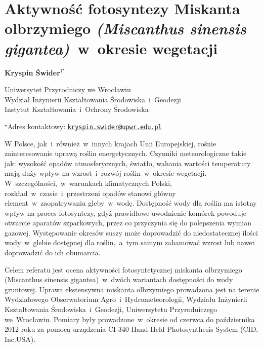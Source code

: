 \documentclass[\main/boa.tex]{subfiles}
\begin{document}
\section{Aktywność fotosyntezy Miskanta olbrzymiego \emph{(Miscanthus sinensis gigantea)}~w~okresie wegetacji}

\begin{center}
  {\bf {} Kryspin \'Swider$^{1^\star}$}
\end{center}

\vskip 0.3cm

\begin{affiliations}
\begin{enumerate}
\begin{minipage}{0.915\textwidth}
\centering
\item  Uniwersytet Przyrodniczy we Wrocławiu\\ Wydział Inżynierii Kształtowania Środowiska~i~Geodezji\\ Instytut Kształtowania~i~Ochrony Środowiska
\end{minipage}
\end{enumerate}
$^\star$Adres kontaktowy: \href{mailto:kryspin.swider@upwr.edu.pl}{\nolinkurl{kryspin.swider@upwr.edu.pl}}\\
\end{affiliations}

\vskip 0.5cm


\vskip 0.5cm

W Polsce, jak~i~również~w~innych krajach Unii Europejskiej, rośnie zainteresowanie uprawą roślin energetycznych. Czynniki meteorologiczne takie jak: wysokość opadów atmosferycznych, światło, wahania wartości temperatury mają duży wpływ na wzrost~i~rozwój roślin~w~okresie wegetacji. W~szczególności,~w~warunkach klimatycznych Polski, rozkład~w~czasie~i~przestrzeni opadów stanowi główny element~w~zaopatrywaniu gleby~w~wodę. Dostępność wody dla roślin ma istotny wpływ na proces fotosyntezy, gdyż prawidłowe uwodnienie komórek powoduje otwarcie aparatów szparkowych, przez co przyczynia się do polepszenia wymian gazowej. Występowanie okresów suszy może doprowadzić do niedostatecznej ilości wody~w~glebie dostępnej dla roślin,~a~tym samym zahamować wzrost lub nawet doprowadzić do ich obumarcia.

Celem referatu jest ocena aktywności fotosyntetycznej miskanta olbrzymiego (Miscanthus sinensis gigantea)~w~dwóch wariantach dostępności do wody gruntowej. Uprawa ekstensywna miskanta olbrzymiego prowadzona jest na terenie Wydziałowego Obserwatorium Agro~i~Hydrometeorologii, Wydziału Inżynierii Kształtowania Środowiska~i~Geodezji, Uniwersytetu Przyrodniczego we~Wrocławiu. Pomiary były prowadzone~w~okresie od czerwca do października 2012 roku za pomocą urządzenia CI-340 Hand-Held Photosynthesis System (CID, Inc.USA). 
\end{document}
